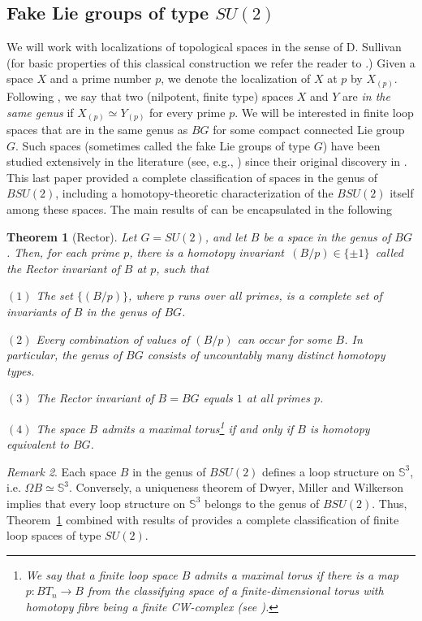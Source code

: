 \documentclass[11pt]{amsart}
\newtheorem{theorem}{Theorem}[section]
\theoremstyle{definition}
\theoremstyle{remark}
\newtheorem{remark}[theorem]{Remark}
\numberwithin{equation}{section}
\newcommand{\la}{\label}
\def\bS{\mathbb S}
\begin{document}
\subsection{Fake Lie groups of type $SU(2)$}
We will work with localizations of topological spaces in the sense of D. Sullivan (for basic properties of this classical construction we refer the reader to \cite[Part 2]{MP12}.) Given a space $X$ and a prime  number $p$, we denote the localization of $X$ at $p$ by $X_{(p)}$. Following \cite[8.5.1]{MP12}, we say that two (nilpotent, finite type) spaces $X$ and $Y$ are {\it in the same genus} if $X_{(p)} \simeq Y_{(p)} $ for every prime $p$. We will be interested in finite loop spaces that are in the same genus as $BG$ for some compact connected Lie group $G$. Such spaces (sometimes called the fake Lie groups of type $G$) have been studied extensively in the literature (see, e.g., \cite{NS90}) since their original discovery in \cite{Rec71}.  This last paper provided a complete classification of spaces in the genus of $ BSU(2)$, including a homotopy-theoretic characterization of the $ BSU(2) $ itself among these spaces. The main results of \cite{Rec71} can be encapsulated in the following
%
\begin{theorem}[Rector] 
\la{RTh}
Let $G = SU(2)$, and  let $B$ be a space in the genus of $ BG $. 
Then, for each prime $p$, there is a homotopy invariant $\,(B/p) \in \{\pm 1\}\,$ called the {\rm Rector invariant} of $B$ at $p$, such that 

 $(1)$ The set $\{(B/p)\}$, where $p$ runs over all primes, is a complete set of  invariants
  of $B$ in the genus of $ BG$.
 
 $(2)$ Every combination of values of $ (B/p) $ can occur for some $B$. In particular, the genus of $BG$ consists of uncountably many distinct homotopy types.
 
 $(3)$ The Rector invariant of $ B = BG $ equals  $1$ at all primes $p$.
 
 $(4)$ The space $B$ admits a maximal torus\footnote{We say that a finite loop space $B$ admits a maximal torus if there is a map $ p: BT_n \to B $ from the classifying space of a finite-dimensional torus with homotopy fibre being a finite CW-complex (see \cite{Rec71b}).} if and only if $B$ is homotopy equivalent to $BG$.
\end{theorem}
%
\begin{remark}
Each space $B$ in the genus of $ BSU(2)$ defines a loop structure on $\bS^3 $, i.e. $ \Omega B \simeq \bS^3 $. Conversely, a uniqueness theorem of Dwyer, Miller and Wilkerson \cite{DMW87} implies that every loop structure on $ \bS^3 $ belongs to the genus of $ BSU(2) $. Thus, Theorem~\ref{RTh} combined with results of \cite{DMW87} provides a complete classification of finite loop spaces of type $SU(2)$.
\end{remark}
\end{document}
